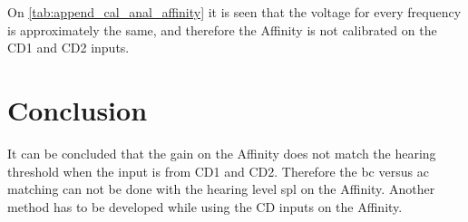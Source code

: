 On  \autoref{tab:append_cal_anal_affinity} it is seen that the voltage for every frequency is approximately the same, and therefore the Affinity is not calibrated on the CD1 and CD2 inputs.

\section*{Conclusion}
It can be concluded that the gain on the Affinity does not match the hearing threshold when the input is from CD1 and CD2. Therefore the \gls{bc} versus \gls{ac} matching can not be done with the hearing level \gls{spl} on the Affinity. Another method has to be developed while using the CD inputs on the Affinity.




